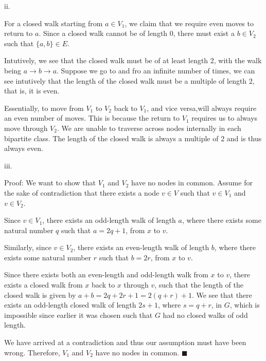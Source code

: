 \documentclass{article}
\renewcommand{\(}{\left(}
\renewcommand{\)}{\right)}
\theoremstyle{plain}
\theoremstyle{plain}
\theoremstyle{definition}
\begin{document}
    ii.
    \begin{shaded}
        For a closed walk starting from $a\in V_{1}$, we claim that we require even moves to return to $a$. Since a closed walk cannot be of length $0$, there must exist a $b\in V_{2}$ such that $\{a,b\}\in E$.

        \vspace{4mm}

        Intutively, we see that the closed walk must be of at least length 2, with the walk being $a\to b\to a$. Suppose we go to and fro an infinite number of times, we can see intutively that the length of the closed walk must be a multiple of length 2, that is, it is even.

        \vspace{4mm}

        Essentially, to move from $V_{1}$ to $V_{2}$ back to $V_{1}$, and vice versa,will always require an even number of moves. This is because the return to $V_{1}$ requires us to always move through $V_{2}$. We are unable to traverse across nodes internally in each bipartite class. The length of the closed walk is always a multiple of 2 and is thus always even.
    \end{shaded}
    
    iii.
    \begin{shaded}
        Proof: We want to show that $V_{1}$ and $V_{2}$ have no nodes in common. Assume for the sake of contradiction that there exists a node $v\in V$ such that $v\in V_{1}$ and $v\in V_{2}$.

        \vspace{4mm}

        Since $v\in V_{1}$, there exists an odd-length walk of length $a$, where there exists some natural number $q$ such that $a=2q+1$, from $x$ to $v$.

        Similarly, since $v\in V_{2}$, there exists an even-length walk of length $b$, where there exists some natural number $r$ such that $b=2r$, from $x$ to $v$.

        \vspace{4mm}

        Since there exists both an even-length and odd-length walk from $x$ to $v$, there exists a closed walk from $x$ back to $x$ through $v$, such that the length of the closed walk is given by $a+b=2q+2r+1=2(q+r)+1$. We see that there exists an odd-length closed walk of length $2s+1$, where $s=q+r$, in $G$, which is impossible since earlier it was chosen such that $G$ had no closed walks of odd length.

        \vspace{4mm}

        We have arrived at a contradiction and thus our assumption must have been wrong. Therefore, $V_{1}$ and $V_{2}$ have no nodes in common. $\blacksquare$
    \end{shaded}
    
\end{document}

